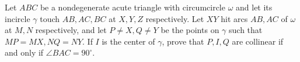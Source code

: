Let $ABC$ be a nondegenerate acute triangle with circumcircle $\omega$ and let its incircle $\gamma$ touch $AB, AC, BC$ at $X, Y, Z$ respectively. Let $XY$ hit arcs $AB, AC$ of $\omega$ at $M, N$ respectively, and let $P \neq X, Q \neq Y$ be the points on $\gamma$ such that $MP=MX,  NQ=NY$. If $I$ is the center of $\gamma$, prove that $P, I, Q$ are collinear if and only if $\angle BAC=90^\circ$.

